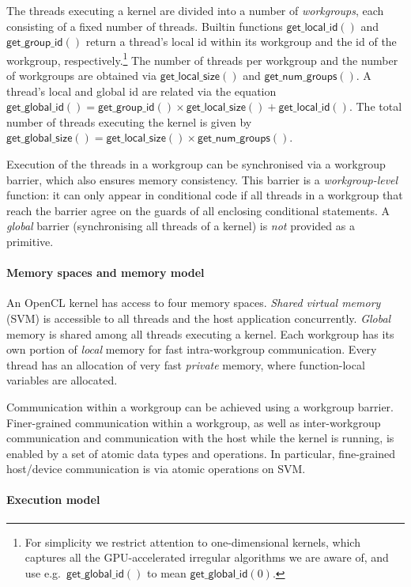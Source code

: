 \documentclass[numbers,nocopyrightspace,10pt]{sigplanconf}
\newcommand{\getgroupid}{\mathsf{get\_group\_id}}
\newcommand{\getnumgroups}{\mathsf{get\_num\_groups}}
\newcommand{\getlocalid}{\mathsf{get\_local\_id}}
\newcommand{\getglobalid}{\mathsf{get\_global\_id}}
\newcommand{\getlocalsize}{\mathsf{get\_local\_size}}
\newcommand{\getglobalsize}{\mathsf{get\_global\_size}}
\begin{document}
The threads executing a kernel are divided into a number of \emph{workgroups}, each consisting of a fixed number of threads.  Builtin functions
$\getlocalid()$ and $\getgroupid()$ return a thread's local id within
its workgroup and the id of the workgroup, respectively.\footnote{For simplicity we restrict attention to one-dimensional kernels, which captures all the
GPU-accelerated irregular algorithms we are aware of, and use
e.g.\ $\getglobalid()$ to mean $\getglobalid(0)$.
}  The number
of threads per workgroup and the number of workgroups are obtained via
$\getlocalsize()$ and $\getnumgroups()$.  A thread's local and global
id are related via the equation $\getglobalid() = \getgroupid() \times
\getlocalsize() + \getlocalid()$.  The total number of threads executing the kernel is given by $\getglobalsize() = \getlocalsize()\times\getnumgroups()$.

Execution of the threads in a workgroup can be synchronised via a
workgroup barrier, which also ensures memory consistency.  This
barrier is a \emph{workgroup-level} function: it can only
appear in conditional code if all threads in a workgroup that reach
the barrier agree on the guards of all enclosing conditional
statements.  A \emph{global} barrier
(synchronising all threads of a kernel) is \emph{not} provided as
a primitive.

\paragraph{Memory spaces and memory model}
An OpenCL kernel has access to four memory spaces.  \emph{Shared virtual
memory} (SVM) is accessible to all threads and the host application concurrently.  \emph{Global} memory is shared among all threads executing a
kernel.  Each workgroup has its own portion of \emph{local} memory for fast intra-workgroup communication.  Every thread has
an allocation of very fast \emph{private} memory, where
function-local variables are allocated.

Communication within a workgroup can be achieved
using a workgroup barrier.  Finer-grained
communication within a workgroup, as well as inter-workgroup
communication and communication with the host while the kernel is
running, is enabled by a set of atomic data types and operations.  In
particular, fine-grained host/device communication is via atomic
operations on SVM.

\paragraph{Execution model}
\end{document}
